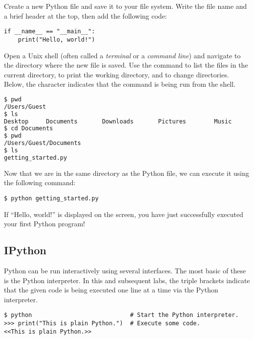 \begin{problem} %
Create a new Python file and save it to your file system.
Write the file name and a brief header at the top, then add the following code:

\begin{lstlisting}
if __name__ == "__main__":
    print("Hello, world!")
\end{lstlisting}

Open a Unix shell (often called a \emph{terminal} or a \emph{command line}) and navigate to the directory where the new file is saved.
Use the command  to list the files in the current directory,  to print the working directory, and  to change directories.
Below, the \li{\$} character indicates that the command is being run from the shell.

\begin{lstlisting}[language=bash]
$ pwd
/Users/Guest
$ ls
Desktop     Documents       Downloads       Pictures        Music
$ cd Documents
$ pwd
/Users/Guest/Documents
$ ls
getting_started.py
\end{lstlisting}

Now that we are in the same directory as the Python file, we can execute it using the following command:

\begin{lstlisting}
$ python getting_started.py
\end{lstlisting}

If ``Hello, world!'' is displayed on the screen, you have just successfully executed your first Python program!
\label{prob:helloWorld}
\end{problem}

\subsection*{IPython} %

Python can be run interactively using several interfaces.
The most basic of these is the Python interpreter.
In this and subsequent labs, the triple brackets \li{>>>} indicate that the given code is being executed one line at a time via the Python interpreter.

\begin{lstlisting}
$ python                            # Start the Python interpreter.
>>> print("This is plain Python.")  # Execute some code.
<<This is plain Python.>>
\end{lstlisting}

